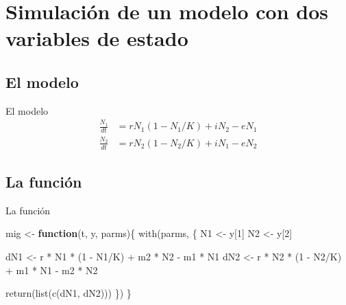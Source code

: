 \documentclass[
  11pt,
  ignorenonframetext,
]{beamer}
\newenvironment{Shaded}{}{}
\newcommand{\ControlFlowTok}[1]{\textcolor[rgb]{0.00,0.44,0.13}{\textbf{#1}}}
\newcommand{\DecValTok}[1]{\textcolor[rgb]{0.25,0.63,0.44}{#1}}
\newcommand{\FunctionTok}[1]{\textcolor[rgb]{0.02,0.16,0.49}{#1}}
\newcommand{\NormalTok}[1]{#1}
\newcommand{\OtherTok}[1]{\textcolor[rgb]{0.00,0.44,0.13}{#1}}
\newcommand{\SpecialCharTok}[1]{\textcolor[rgb]{0.25,0.44,0.63}{#1}}
\begin{document}
\hypertarget{simulaciuxf3n-de-un-modelo-con-dos-variables-de-estado}{%
\section{Simulación de un modelo con dos variables de
estado}\label{simulaciuxf3n-de-un-modelo-con-dos-variables-de-estado}}

\hypertarget{el-modelo}{%
\subsection{El modelo}\label{el-modelo}}

\begin{frame}{El modelo}
\begin{align}
    \frac{N_1}{dt} &= r N_1 (1-N_1/K) + i N_2-e N_1 \\
    \frac{N_2}{dt} &= r N_2 (1-N_2/K) + i N_1-e N_2
\end{align}
\end{frame}

\hypertarget{la-funciuxf3n}{%
\subsection{La función}\label{la-funciuxf3n}}

\begin{frame}[fragile]{La función}
\begin{Shaded}
\begin{Highlighting}[]
\NormalTok{mig }\OtherTok{\textless{}{-}} \ControlFlowTok{function}\NormalTok{(t, y, parms)\{}
  \FunctionTok{with}\NormalTok{(parms, \{}
\NormalTok{      N1 }\OtherTok{\textless{}{-}}\NormalTok{ y[}\DecValTok{1}\NormalTok{]}
\NormalTok{      N2 }\OtherTok{\textless{}{-}}\NormalTok{ y[}\DecValTok{2}\NormalTok{]}
  
\NormalTok{    dN1 }\OtherTok{\textless{}{-}}\NormalTok{ r }\SpecialCharTok{*}\NormalTok{ N1 }\SpecialCharTok{*}\NormalTok{ (}\DecValTok{1} \SpecialCharTok{{-}}\NormalTok{ N1}\SpecialCharTok{/}\NormalTok{K) }\SpecialCharTok{+}\NormalTok{ m2 }\SpecialCharTok{*}\NormalTok{ N2 }\SpecialCharTok{{-}}\NormalTok{ m1 }\SpecialCharTok{*}\NormalTok{ N1}
\NormalTok{    dN2 }\OtherTok{\textless{}{-}}\NormalTok{ r }\SpecialCharTok{*}\NormalTok{ N2 }\SpecialCharTok{*}\NormalTok{ (}\DecValTok{1} \SpecialCharTok{{-}}\NormalTok{ N2}\SpecialCharTok{/}\NormalTok{K) }\SpecialCharTok{+}\NormalTok{ m1 }\SpecialCharTok{*}\NormalTok{ N1 }\SpecialCharTok{{-}}\NormalTok{ m2 }\SpecialCharTok{*}\NormalTok{ N2}
    
    \FunctionTok{return}\NormalTok{(}\FunctionTok{list}\NormalTok{(}\FunctionTok{c}\NormalTok{(dN1, dN2)))}
\NormalTok{  \})}
\NormalTok{\}}
\end{Highlighting}
\end{Shaded}
\end{frame}
\end{document}
